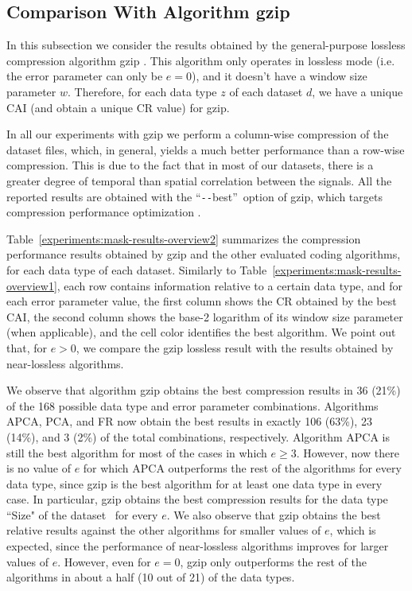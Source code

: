
\subsection{Comparison With Algorithm gzip}
\label{secX:gzip}


\newcommand{\bestdash}{``\texttt{-{}-}best''}
In this subsection we consider the results obtained by the general-purpose lossless compression algorithm gzip \cite{gzip}. This algorithm only operates in lossless mode (i.e. the error parameter can only be $e=0$), and it doesn't have a window size parameter $w$. Therefore, for each data type $z$ of each dataset $d$, we have a unique CAI (and obtain a unique CR value) for gzip. 

In all our experiments with gzip we perform a column-wise compression of the dataset files, which, in general, yields a much better performance than a row-wise compression. This is due to the fact that in most of our datasets, there is a greater degree of temporal than spatial correlation between the signals. All the reported results are obtained with the \bestdash\ option of gzip, which targets compression performance optimization \cite{gzipman}. 


Table~\ref{experiments:mask-results-overview2} summarizes the compression performance results obtained by gzip and the other evaluated coding algorithms, for each data type of each dataset. Similarly to Table~\ref{experiments:mask-results-overview1}, each row contains information relative to a certain data type, and for each error parameter value, the first column shows the CR obtained by the best CAI, the second column shows the base-2 logarithm of its window size parameter (when applicable), and the cell color identifies the best algorithm. We point out that, for $e > 0$, we compare the gzip lossless result with the results obtained by near-lossless algorithms.


We observe that algorithm gzip obtains the best compression results in 36 (21\%) of the 168 possible data type and error parameter combinations. Algorithms APCA, PCA, and FR now obtain the best results in exactly 106 (63\%), 23 (14\%), and 3 (2\%) of the total combinations, respectively. Algorithm APCA is still the best algorithm for most of the cases in which $e \geq 3$. However, now there is no value of $e$ for which APCA outperforms the rest of the algorithms for every data type, since gzip is the best algorithm for at least one data type in every case. In particular, gzip obtains the best compression results for the data type ``Size" of the dataset \datasethail\ for every $e$. We also observe that gzip obtains the best relative results against the other algorithms for smaller values of $e$, which is expected, since the performance of near-lossless algorithms improves for larger values of $e$. However, even for $e=0$, gzip only outperforms the rest of the algorithms in about a half (10 out of 21) of the data types.


